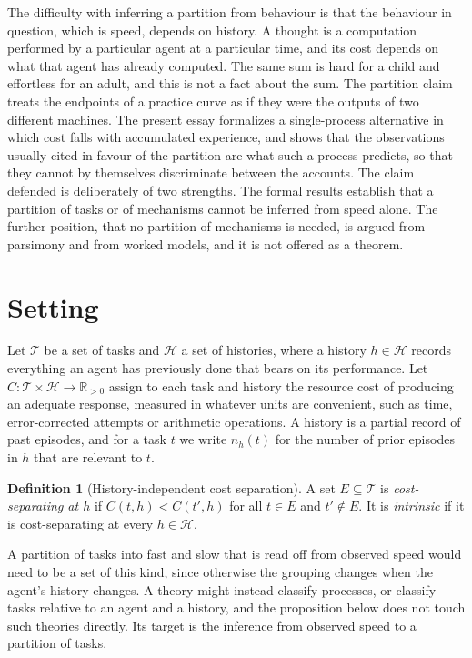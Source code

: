 \documentclass[11pt]{article}
\theoremstyle{definition}
\newtheorem{definition}{Definition}
\newcommand{\T}{\mathcal{T}}
\newcommand{\Hh}{\mathcal{H}}
\newcommand{\R}{\mathbb{R}}
\begin{document}
The difficulty with inferring a partition from behaviour is that the behaviour in question, which is speed, depends on history. A thought is a computation performed by a particular agent at a particular time, and its cost depends on what that agent has already computed. The same sum is hard for a child and effortless for an adult, and this is not a fact about the sum. The partition claim treats the endpoints of a practice curve as if they were the outputs of two different machines. The present essay formalizes a single-process alternative in which cost falls with accumulated experience, and shows that the observations usually cited in favour of the partition are what such a process predicts, so that they cannot by themselves discriminate between the accounts. The claim defended is deliberately of two strengths. The formal results establish that a partition of tasks or of mechanisms cannot be inferred from speed alone. The further position, that no partition of mechanisms is needed, is argued from parsimony and from worked models, and it is not offered as a theorem.

\section{Setting}

Let $\T$ be a set of tasks and $\Hh$ a set of histories, where a history $h\in\Hh$ records everything an agent has previously done that bears on its performance. Let $C:\T\times\Hh\to\R_{>0}$ assign to each task and history the resource cost of producing an adequate response, measured in whatever units are convenient, such as time, error-corrected attempts or arithmetic operations. A history is a partial record of past episodes, and for a task $t$ we write $n_h(t)$ for the number of prior episodes in $h$ that are relevant to $t$.

\begin{definition}[History-independent cost separation]
A set $E\subseteq\T$ is \emph{cost-separating at $h$} if $C(t,h)<C(t',h)$ for all $t\in E$ and $t'\notin E$. It is \emph{intrinsic} if it is cost-separating at every $h\in\Hh$.
\end{definition}

A partition of tasks into fast and slow that is read off from observed speed would need to be a set of this kind, since otherwise the grouping changes when the agent's history changes. A theory might instead classify processes, or classify tasks relative to an agent and a history, and the proposition below does not touch such theories directly. Its target is the inference from observed speed to a partition of tasks.
\end{document}
